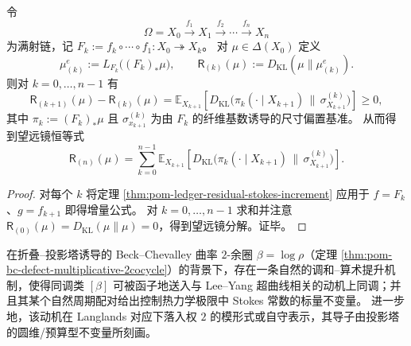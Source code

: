 \begin{corollary}[多层递归投影的残差望远镜分解]\label{cor:pom-ledger-residual-telescoping}
令
\[
\Omega=X_0 \xrightarrow{f_1} X_1 \xrightarrow{f_2}\cdots\xrightarrow{f_n} X_n
\]
为满射链，记 \(F_k:=f_k\circ\cdots\circ f_1:X_0\twoheadrightarrow X_k\)。
对 \(\mu\in\Delta(X_0)\) 定义
\[
\mu^{e}_{(k)}:=L_{F_k}\bigl((F_k)_\ast\mu\bigr),\qquad
\mathsf R_{(k)}(\mu):=D_{\mathrm{KL}}(\mu\|\mu^{e}_{(k)}).
\]
则对 \(k=0,\dots,n-1\) 有
\[
\mathsf R_{(k+1)}(\mu)-\mathsf R_{(k)}(\mu)
=\mathbb E_{X_{k+1}}\!\left[D_{\mathrm{KL}}\bigl(\pi_k(\cdot\mid X_{k+1})\,\|\,\sigma^{(k)}_{X_{k+1}}\bigr)\right]\ge 0,
\]
其中 \(\pi_k:=(F_k)_\ast\mu\) 且 \(\sigma^{(k)}_{x_{k+1}}\) 为由 \(F_k\) 的纤维基数诱导的尺寸偏置基准。
从而得到望远镜恒等式
\[
\boxed{\;
\mathsf R_{(n)}(\mu)
=\sum_{k=0}^{n-1}\mathbb E_{X_{k+1}}\!\left[D_{\mathrm{KL}}\bigl(\pi_k(\cdot\mid X_{k+1})\,\|\,\sigma^{(k)}_{X_{k+1}}\bigr)\right].\;}
\]
\end{corollary}
\begin{proof}
对每个 \(k\) 将定理 \ref{thm:pom-ledger-residual-stokes-increment} 应用于 \(f=F_k\)、\(g=f_{k+1}\) 即得增量公式。
对 \(k=0,\dots,n-1\) 求和并注意 \(\mathsf R_{(0)}(\mu)=D_{\mathrm{KL}}(\mu\|\mu)=0\)，得到望远镜分解。证毕。
\end{proof}

\begin{conjecture}\label{conj:pom-bc-stokes-langlands-leyang}
在折叠--投影塔诱导的 Beck--Chevalley 曲率 \(2\)-余圈 \(\beta=\log\rho\)（定理 \ref{thm:pom-bc-defect-multiplicative-2cocycle}）的背景下，存在一条自然的调和--算术提升机制，使得同调类 \([\beta]\) 可被函子地送入与 Lee--Yang 超曲线相关的动机上同调；并且其某个自然周期配对给出控制热力学极限中 Stokes 常数的标量不变量。
进一步地，该动机在 Langlands 对应下落入权 \(2\) 的模形式或自守表示，其导子由投影塔的圆维/预算型不变量所刻画。
\end{conjecture}
